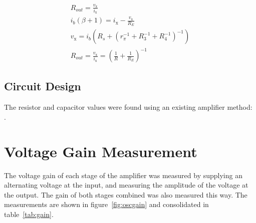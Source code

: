 \documentclass[a4paper,11pt]{article}
\begin{document}
            \begin{subequations}
            \begin{gather}
                R_{out} = \frac{v_\mathrm{x}}{i_\mathrm{x}} \\
                i_b (\beta + 1) = i_\mathrm{x} - \frac{v_\mathrm{x}}{R_E} \\
                v_\mathrm{x} = i_b (R_s + \left( r_{\pi}^{-1} + R_{3}^{-1} + R_{4}^{-1} \right)^{-1} ) \\
                R_{out} = \frac{v_\mathrm{x}}{i_\mathrm{x}} = \left( \frac{1}{R} + \frac{1}{R_E} \right)^{-1}
            \end{gather}
            \end{subequations}
            
    \subsection{Circuit Design}
        The resistor and capacitor values were found using an existing amplifier method: \cite{ampDesign}.

\newpage
\section{Voltage Gain Measurement}
    The voltage gain of each stage of the amplifier was measured by supplying an alternating voltage at the input, and measuring the amplitude of the voltage at the output. The gain of both stages combined was also measured this way. The measurements are shown in figure~\ref{fig:oscgain} and consolidated in table~\ref{tab:gain}.
    
\end{document}
